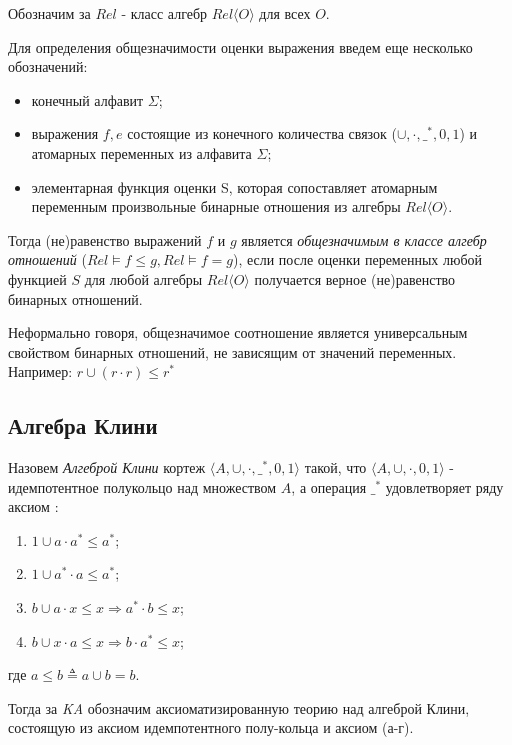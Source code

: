 \documentclass[times
              ,specification
              ,annotation
              ]{itmo-student-thesis}
\begin{document}
      Обозначим за $\mathit{Rel}$ - класс алгебр $ \mathit{Rel}\langle O \rangle $ для всех $ O $.

      Для определения общезначимости оценки выражения введем еще несколько обозначений:
      \begin{itemize}
        \item конечный алфавит $ \Sigma $;
        \item выражения $ f, e $ состоящие из конечного количества связок
        ($ \cup, \cdot, \_^* , 0, 1 $) и атомарных переменных из алфавита $ \Sigma $;
        \item элементарная функция оценки S, которая сопоставляет атомарным переменным произвольные
          бинарные отношения из алгебры $ Rel \langle O \rangle $.
      \end{itemize}
      Тогда (не)равенство выражений $ f $ и $ g $ является \textit{общезначимым в классе алгебр отношений}
      ($\mathit{Rel} \models f \leq g, \mathit{Rel} \models f = g $),
      если после оценки переменных любой функцией $ S $ для любой алгебры $ \mathit{Rel}\langle O \rangle $
      получается верное (не)равенство бинарных отношений.

      Неформально говоря, общезначимое соотношение является универсальным свойством
      бинарных отношений, не зависящим от значений переменных. Например: $ r \cup (r \cdot r) \leq r^*$
      
    \subsection{Алгебра Клини}
      Назовем \textit{Алгеброй Клини} кортеж $\langle A,\cup,\cdot,\_^*,0,1\rangle$ такой, что $\langle A, \cup, \cdot, 0, 1 \rangle$ -
      идемпотентное полукольцо над множеством $A$, а операция $ \_^* $ удовлетворяет ряду аксиом \cite{ka_axioms}:
      \begin{enumerate}
        \item $ 1 \cup a \cdot a^* \leq a^* $;
        \item $ 1 \cup a^* \cdot a \leq a^* $;
        \item $ b \cup a \cdot x \leq x \Rightarrow a^* \cdot b \leq x $;
        \item $ b \cup x \cdot a \leq x \Rightarrow b \cdot a^* \leq x $;
      \end{enumerate}
      где  $ a \leq b \triangleq a \cup b = b$.

      Тогда за \textit{KA} обозначим аксиоматизированную теорию над алгеброй Клини, состоящую из аксиом
      идемпотентного полу-кольца и аксиом (а-г).
\end{document}
